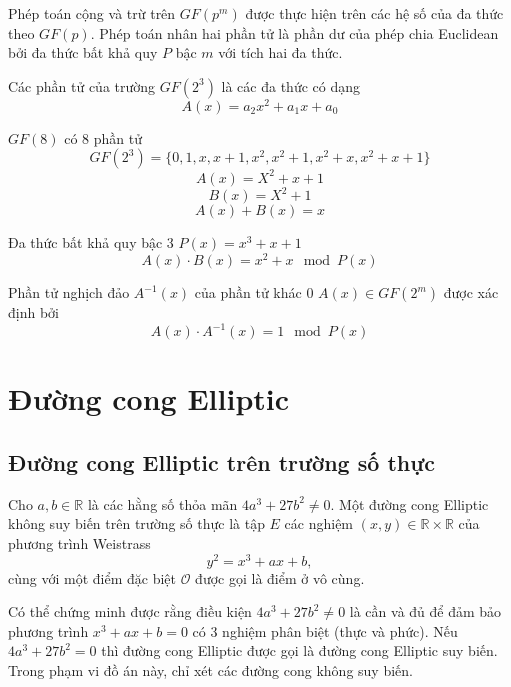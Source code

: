 \documentclass[../main.tex]{subfiles}
\begin{document}
Phép toán cộng và trừ trên $GF(p^m)$ được thực hiện trên các hệ số của đa thức theo $GF(p)$.
Phép toán nhân hai phần tử là phần dư của phép chia Euclidean bởi đa thức bất khả quy $P$ bậc $m$ với tích hai đa thức.

\begin{vd}
\end{vd}

Các phần tử của trường $GF(2^3)$ là các đa thức có dạng
$$ A(x) = a_2x^2 +a_1x +a_0
$$

$GF(8)$ có 8 phần tử
$$GF(2^3) = \{0,1,x,x+1,x^2,x^2+1,x^2+x,x^2+x+1\}
$$
$$A(x) = X^2+x+1
$$
$$B(x) = X^2 +1
$$
$$A(x) + B(x) = x
$$

Đa thức  bất khả quy bậc 3 $P(x) = x^3+x+1$ 
$$A(x)\cdot B(x) = x^2+x \mod P(x)
$$

Phần tử nghịch đảo $A^{-1}(x)$ của phần tử khác 0 $A(x) \in GF(2^m)$ được xác định bởi
$$A(x)\cdot A^{-1}(x) = 1 \mod P(x)
$$

\section{Đường cong Elliptic}
\subsection{Đường cong Elliptic trên trường số thực}
\begin{dn} \rm
Cho $a,b\in \mathbb{R}$ là các hằng số thỏa mãn $4a^3+27b^2\ne 0$. Một đường cong Elliptic không suy biến trên trường số thực là tập $E$ các nghiệm $(x,y)\in \mathbb{R}\times\mathbb{R}$ của phương trình Weistrass
$$y^2=x^3+ax+b,$$
cùng với một điểm đặc biệt $\mathcal{O}$ được gọi là điểm ở vô cùng.
\end{dn}
\begin{cy}
Có thể chứng minh được rằng điều kiện $4a^3+27b^2\ne 0$ là cần và đủ để đảm bảo phương trình $x^3+ax+b=0$ có 3 nghiệm phân biệt (thực và phức). Nếu $4a^3+27b^2=0$ thì đường cong Elliptic được gọi là đường cong Elliptic suy biến. Trong phạm vi đồ án này, chỉ xét các đường cong không suy biến.
\end{cy}
\end{document}

